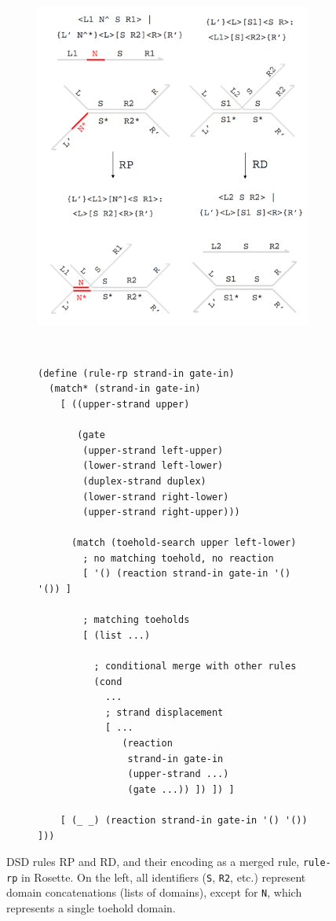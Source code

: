 \documentclass{article}
\begin{document}
\begin{figure}[h]

\begin{subfigure}[c]{0.5\textwidth}
\includegraphics[width=\textwidth]{figures/rule-merge.png}
\end{subfigure}
~
\begin{subfigure}[c]{0.5\textwidth}
\begin{lstlisting}[basicstyle=\footnotesize\ttfamily]
(define (rule-rp strand-in gate-in)
  (match* (strand-in gate-in)
    [ ((upper-strand upper)

       (gate
        (upper-strand left-upper)
        (lower-strand left-lower)
        (duplex-strand duplex)
        (lower-strand right-lower)
        (upper-strand right-upper)))

      (match (toehold-search upper left-lower)
        ; no matching toehold, no reaction
        [ '() (reaction strand-in gate-in '() '()) ]

        ; matching toeholds
        [ (list ...)

          ; conditional merge with other rules
          (cond
            ...
            ; strand displacement
            [ ...
               (reaction
                strand-in gate-in
                (upper-strand ...)
                (gate ...)) ]) ]) ]

    [ (_ _) (reaction strand-in gate-in '() '()) ]))
\end{lstlisting}
\end{subfigure}
\caption{
DSD rules RP and RD, and their encoding as a merged rule, \lstinline{rule-rp} in
Rosette.  On the left, all identifiers (\lstinline{S}, \lstinline{R2}, etc.)
represent domain concatenations (lists of domains), except for \lstinline{N},
which represents a single toehold domain.
}
\label{figure:example-rule}
\end{figure}
\end{document}

